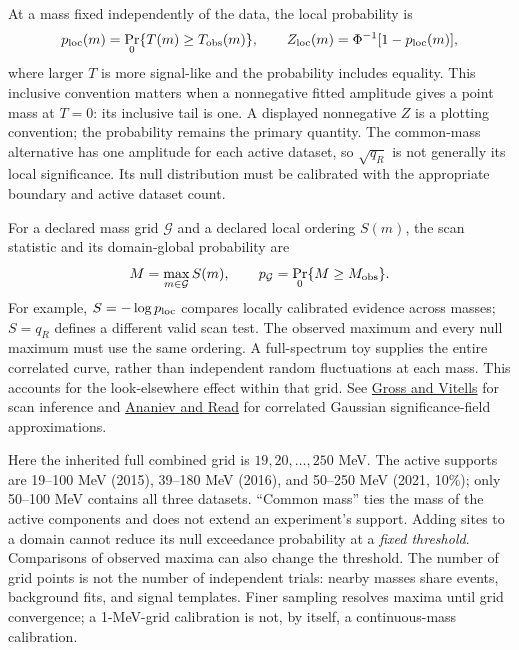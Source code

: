 At a mass fixed independently of the data, the local probability is
\begin{equation}
 p_{\rm loc}(m)=\Pr_{0}\{T(m)\geq T_{\rm obs}(m)\},
 \qquad Z_{\rm loc}(m)=\Phi^{-1}[1-p_{\rm loc}(m)],
\end{equation}
where larger $T$ is more signal-like and the probability includes equality.
This inclusive convention matters when a nonnegative fitted amplitude gives
a point mass at $T=0$: its inclusive tail is one. A displayed nonnegative
$Z$ is a plotting convention; the probability remains the primary quantity.
The common-mass alternative has one amplitude for each active dataset, so
$\sqrt{q_R}$ is not generally its local significance. Its null distribution
must be calibrated with the appropriate boundary and active dataset count.

For a declared mass grid $\mathcal G$ and a declared local ordering $S(m)$,
the scan statistic and its domain-global probability are
\begin{equation}
 M=\max_{m\in\mathcal G} S(m),\qquad
 p_{\mathcal G}=\Pr_0\{M\geq M_{\rm obs}\}.
\end{equation}
For example, $S=-\log p_{\rm loc}$ compares locally calibrated evidence
across masses; $S=q_R$ defines a different valid scan test. The observed
maximum and every null maximum must use the same ordering. A full-spectrum
toy supplies the entire correlated curve, rather than independent random
fluctuations at each mass. This accounts for the look-elsewhere effect within
that grid. See
\href{https://arxiv.org/abs/1005.1891}{Gross and Vitells} for scan inference and
\href{https://arxiv.org/abs/2206.12328}{Ananiev and Read} for correlated Gaussian
significance-field approximations.

Here the inherited full combined grid is $19,20,\ldots,250$ MeV. The active
supports are 19--100 MeV (2015), 39--180 MeV (2016), and 50--250 MeV
(2021, 10\%); only 50--100 MeV contains all three datasets. ``Common mass''
ties the mass of the active components and does not extend an experiment's
support. Adding sites to a domain cannot reduce its null exceedance
probability at a \emph{fixed threshold}. Comparisons of observed maxima can
also change the threshold. The number of grid points is not the number of
independent trials: nearby masses share events, background fits, and signal
templates. Finer sampling resolves maxima until grid convergence; a
1-MeV-grid calibration is not, by itself, a continuous-mass calibration.

